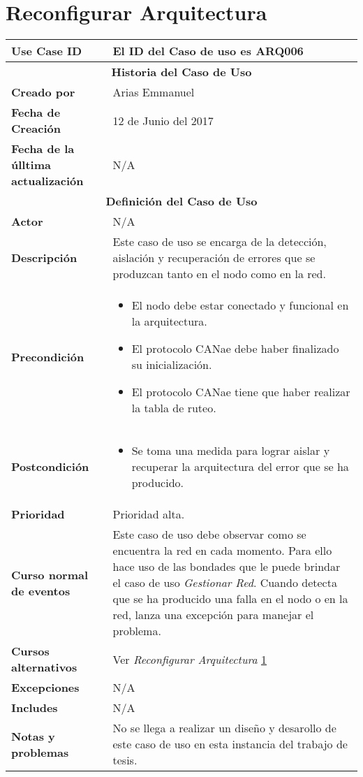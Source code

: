 
\section{Reconfigurar Arquitectura}\label{uc:ReconfigurarArquitectura}

\begin{longtable}{|p{5cm}|p{8cm}|}
  \hline
  \textbf{Use Case ID} & El ID del Caso de uso es ARQ006 \\ \hline
  \multicolumn{2}{|c|}{\Large\textbf{Historia del Caso de Uso}} \\ \hline
  \textbf{Creado por} & Arias Emmanuel \\ \hline
  \textbf{Fecha de Creación} & 12 de Junio del 2017 \\ \hline
  \textbf{Fecha de la úlltima actualización} & N/A \\ \hline
  \multicolumn{2}{|c|}{\Large\textbf{Definición del Caso de Uso}} \\ \hline
  \textbf{Actor} & N/A \\ \hline
  \textbf{Descripción} & Este caso de uso se encarga de la detección, aislación
y recuperación de errores que se produzcan tanto en el nodo
como en la red. \\ \hline
  \textbf{Precondición} & \begin{itemize}
\item El nodo debe estar conectado y funcional en la arquitectura.
\item El protocolo CANae debe haber finalizado su inicialización.
\item El protocolo CANae tiene que haber realizar la tabla de ruteo.
\end{itemize}\\ \hline
  \textbf{Postcondición}  & \begin{itemize}
\item Se toma una medida para lograr aislar y recuperar la arquitectura
  del error que se ha producido.
\end{itemize} \\ \hline
  \textbf{Prioridad} & Prioridad alta. \\ \hline
  \textbf{Curso normal de eventos} & Este caso de uso debe observar como se encuentra la red en cada momento. Para
ello hace uso de las bondades que le puede brindar el caso de uso \textit{
  Gestionar Red}. Cuando detecta que se ha producido una falla en el nodo o en la red,
lanza una excepción para manejar el problema. 
 \\ \hline
\textbf{Cursos alternativos} & Ver \textit{Reconfigurar Arquitectura} \ref{uc:ReconfigurarArquitectura} \\ \hline
\textbf{Excepciones} & N/A \\ \hline
\textbf{Includes} & N/A \\ \hline
\textbf{Notas y problemas} & No se llega a realizar un diseño y desarollo de este caso de uso
en esta instancia del trabajo de tesis. \\ \hline
\end{longtable}


